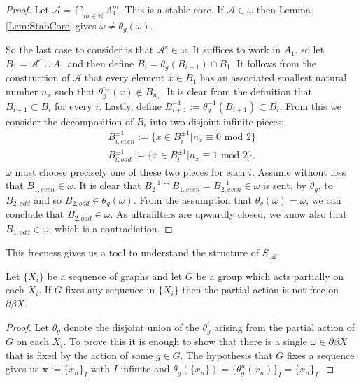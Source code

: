 \begin{conjecture}
\begin{proof}
Let $\mathcal{A} = \bigcap_{m\in \mathbb{N}} A_{1}^{m}$. This is a stable core. If $\mathcal{A} \in \omega$ then Lemma \ref{Lem:StabCore} gives $\omega \not = \theta_{g}(\omega)$.

So the last case to consider is that $\mathcal{A}^{c}\in \omega$. It suffices to work in $A_{1}$, so let $B_{1}=\mathcal{A}^{c}\cup A_{1}$ and then define $B_{i} = \theta_{g}(B_{i-1})\cap B_{1}$. It follows from the construction of $\mathcal{A}$ that every element $x \in B_{1}$ has an associated smallest natural number $n_{x}$ such that $\theta_{g}^{n_{x}}(x) \not \in B_{n_{x}}$. It is clear from the definition that $B_{i+1} \subset B_{i}$ for every $i$. Lastly, define $B^{-1}_{i+1}:=\theta_{g}^{-1}(B_{i+1}) \subset B_{i}$.  From this we consider the decomposition of $B_{i}$ into two disjoint infinite pieces:
\begin{eqnarray*}
B^{\pm 1}_{i,even}:= \lbrace x \in B_{i}^{\pm 1} | n_{x} \equiv 0 \mbox{ mod } 2 \rbrace \\
B^{\pm 1}_{i,odd}:= \lbrace x \in B_{i}^{\pm 1} | n_{x} \equiv 1 \mbox{ mod } 2 \rbrace.
\end{eqnarray*} 
$\omega$ must choose precisely one of these two pieces for each $i$. Assume without loss that $B_{1,even} \in \omega$. It is clear that $B^{-1}_{2} \cap B_{1,even} = B_{2,even}^{-1} \in \omega$ is sent, by $\theta_{g}$, to $B_{2,odd}$ and so $B_{2,odd} \in \theta_{g}(\omega)$. From the assumption that $\theta_{g}(\omega)=\omega$, we can conclude that $B_{2,odd} \in  \omega$. As ultrafilters are upwardly closed, we know also that $B_{1,odd} \in \omega$, which is a contradiction. 
\end{proof}

This freeness gives us a tool to understand the structure of $S_{\inf}$.

\begin{lemma}\label{Lem:CP}
Let $\lbrace X_{i} \rbrace$ be a sequence of graphs and let $G$ be a group which acts partially on each $X_{i}$. If $G$ fixes any sequence in $\lbrace X_{i} \rbrace$ then the partial action is not free on $\partial \beta X$. 
\end{lemma}
\begin{proof}Let $\theta_{g}$ denote the disjoint union of the $\theta_{g}^{i}$ arising from the partial action of $G$ on each $X_{i}$. To prove this it is enough to show that there is a single $\omega \in\partial\beta X$ that is fixed by the action of some $g \in G$. The hypothesis that $G$ fixes a sequence gives us $\textbf{x}:=\lbrace x_{n} \rbrace_{I}$ with $I$ infinite and $\theta_{g}(\lbrace x_{n} \rbrace) = \lbrace\theta_{g}^{n}(x_{n}) \rbrace_{I} =\lbrace x_{n} \rbrace_{I}$.


\end{proof}
\end{conjecture}

